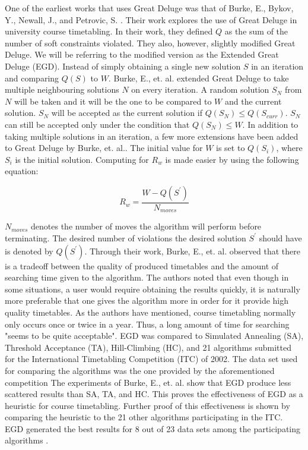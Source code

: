 
One of the earliest works that uses Great Deluge was that of Burke, E., Bykov, Y., Newall, J., and Petrovic, S. \cite{gd-burke}. Their work explores the use of Great Deluge in university course timetabling. In their work, they defined $Q$ as the sum of the number of soft constraints violated. They also, however, slightly modified Great Deluge. We will be referring to the modified version as the Extended Great Deluge (EGD). Instead of simply obtaining a single new solution $S$ in an iteration and comparing $Q(S)$ to $W$. Burke, E., et. al. extended Great Deluge to take multiple neighbouring solutions $N$ on every iteration. A random solution $S_{N}$ from $N$ will be taken and it will be the one to be compared to $W$ and the current solution. $S_{N}$ will be accepted as the current solution if $Q(S_{N}) \leq Q(S_{curr})$. $S_{N}$ can still be accepted only under the condition that $Q(S_{N}) \leq W$. In addition to taking multiple solutions in an iteration, a few more extensions have been added to Great Deluge by Burke, et. al.. The initial value for $W$ is set to $Q(S_{i})$, where $S_{i}$ is the initial solution. Computing for $R_{w}$ is made easier by using the following equation:

\[
    R_{w} = \frac{W - Q(S^{'})}{N_{moves}}
\]

$N_{moves}$ denotes the number of moves the algorithm will perform before terminating. The desired number of violations the desired solution $S^{'}$ should have is denoted by $Q(S^{'})$. Through their work, Burke, E., et. al. observed that there is a tradeoff between the quality of produced timetables and the amount of searching time given to the algorithm. The authors noted that even though in some situations, a user would require obtaining the results quickly, it is naturally more preferable that one gives the algorithm more in order for it provide high quality timetables. As the authors have mentioned, course timetabling normally only occurs once or twice in a year. Thus, a long amount of time for searching "seems to be quite acceptable". EGD was compared to Simulated Annealing (SA), Threshold Acceptance (TA), Hill-Climbing (HC), and 21 algorithms submitted for the International Timetabling Competition (ITC) of 2002. The data set used for comparing the algorithms was the one provided by the aforementioned competition The experiments of Burke, E., et. al. show that EGD produce less scattered results than SA, TA, and HC. This proves the effectiveness of EGD as a heuristic for course timetabling. Further proof of this effectiveness is shown by comparing the heuristic to the 21 other algorithms participating in the ITC. EGD generated the best results for 8 out of 23 data sets among the participating algorithms \cite{gd-burke}.

